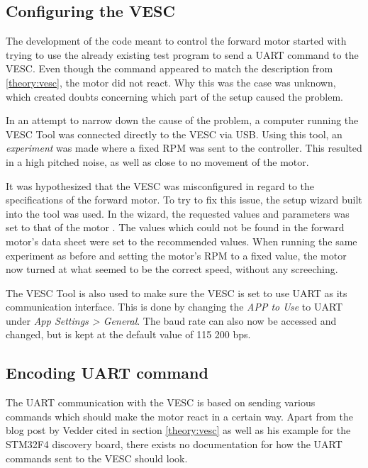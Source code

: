 \subsection{Configuring the VESC} \label{method:configuringVesc}

The development of the code meant to control the forward motor started with trying to use the already existing test program to send a UART command to the VESC. Even though the command appeared to match the description from \ref{theory:vesc}, the motor did not react. Why this was the case was unknown, which created doubts concerning which part of the setup caused the problem.

In an attempt to narrow down the cause of the problem, a computer running the VESC Tool was connected directly to the VESC via USB. Using this tool, an \textit{experiment} was made where a fixed RPM was sent to the controller. This resulted in a high pitched noise, as well as close to no movement of the motor.

It was hypothesized that the VESC was misconfigured in regard to the specifications of the forward motor. To try to fix this issue, the setup wizard built into the tool was used. In the wizard, the requested values and parameters was set to that of the motor \cite{Shimano2022DU-E6010}. The values which could not be found in the forward motor's data sheet were set to the recommended values. When running the same experiment as before and setting the motor's RPM to a fixed value, the motor now turned at what seemed to be the correct speed, without any screeching.

The VESC Tool is also used to make sure the VESC is set to use UART as its communication interface. This is done by changing the \textit{APP to Use} to UART under \textit{App Settings > General}. The baud rate can also now be accessed and changed, but is kept at the default value of 115 200 bps.

\subsection{Encoding UART command}

The UART communication with the VESC is based on sending various commands which should make the motor react in a certain way. Apart from the blog post by Vedder cited in section \ref{theory:vesc} as well as his example for the STM32F4 discovery board, there exists no documentation for how the UART commands sent to the VESC should look. 

